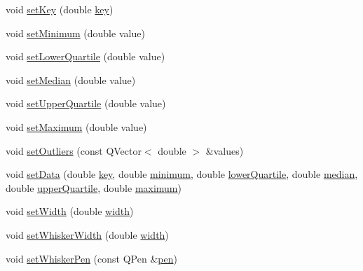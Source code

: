\begin{DoxyCompactItemize}
\item 
void \hyperlink{class_q_c_p_statistical_box_a84a1c6d34b2f9af40bca0c527d51e97e}{set\+Key} (double \hyperlink{class_q_c_p_statistical_box_a767af754f39872d6308b900a0d1758ca}{key})
\item 
void \hyperlink{class_q_c_p_statistical_box_a84ff7cc61ba44890f0c3e0c99c19941e}{set\+Minimum} (double value)
\item 
void \hyperlink{class_q_c_p_statistical_box_a680941af5e23d902013962fa67223f9e}{set\+Lower\+Quartile} (double value)
\item 
void \hyperlink{class_q_c_p_statistical_box_a65970e77a897da4ecb4b15300868aad3}{set\+Median} (double value)
\item 
void \hyperlink{class_q_c_p_statistical_box_a65a1375f941c5a2077b5201229e89346}{set\+Upper\+Quartile} (double value)
\item 
void \hyperlink{class_q_c_p_statistical_box_acec5ad1901f00f2c5387cfb4d9787eb3}{set\+Maximum} (double value)
\item 
void \hyperlink{class_q_c_p_statistical_box_af9bc09620e0bf93bf444ee35e5800d1d}{set\+Outliers} (const Q\+Vector$<$ double $>$ \&values)
\item 
void \hyperlink{class_q_c_p_statistical_box_adf50c57b635edb12470c0e4a986aff37}{set\+Data} (double \hyperlink{class_q_c_p_statistical_box_a767af754f39872d6308b900a0d1758ca}{key}, double \hyperlink{class_q_c_p_statistical_box_acd94c05d59c05d9146d3b60d9f52df82}{minimum}, double \hyperlink{class_q_c_p_statistical_box_af9c4a98f5ca95b5a5a8b140f57b64ace}{lower\+Quartile}, double \hyperlink{class_q_c_p_statistical_box_a44abdee617fe0bca72e6a2ea3fd492de}{median}, double \hyperlink{class_q_c_p_statistical_box_abd15951907b54343a89b1f7feddcb7a7}{upper\+Quartile}, double \hyperlink{class_q_c_p_statistical_box_a928bcf07dd2176affad91d85be03172f}{maximum})
\item 
void \hyperlink{class_q_c_p_statistical_box_a0b62775bd67301b1eba5c785f2b26f14}{set\+Width} (double \hyperlink{class_q_c_p_statistical_box_a0733a7bd575fc5929ce6d507bcc2a04c}{width})
\item 
void \hyperlink{class_q_c_p_statistical_box_adf378812446bd66f34d1f7f293d991cd}{set\+Whisker\+Width} (double \hyperlink{class_q_c_p_statistical_box_a0733a7bd575fc5929ce6d507bcc2a04c}{width})
\item 
void \hyperlink{class_q_c_p_statistical_box_a4a5034cb3b9b040444df05ab1684620b}{set\+Whisker\+Pen} (const Q\+Pen \&\hyperlink{class_q_c_p_abstract_plottable_a41d060007cc6b3037c9c04d22d0c0398}{pen})

\end{DoxyCompactItemize}

